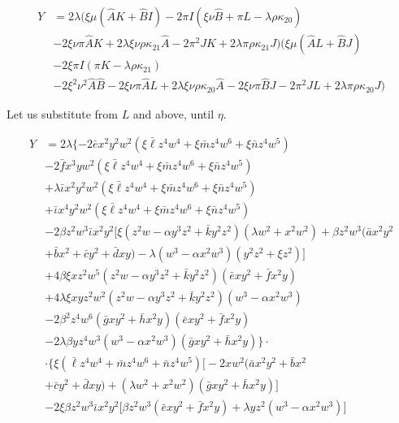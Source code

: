 \begin{align}
Y &= 2\lambda (\xi \mu(\hat AK  + \hat BI )-2\pi I(\xi \nu \hat B + \pi L - \lambda \rho \kappa_{20}) \\
& -2\xi \nu \pi \hat A K +2 \lambda \xi \nu \rho \kappa_{21} \hat A -2  \pi^2 J K +2 \lambda \pi \rho \kappa_{21} J)(\xi \mu(\hat AL + \hat BJ) \\
&-2\xi \pi I(\pi K - \lambda \rho \kappa_{21})\\
&-2\xi^2 \nu^2 \hat A \hat B -2 \xi \nu \pi \hat A L +2 \lambda \xi \nu \rho \kappa_{20} \hat A-2 \xi \nu \pi \hat B J -2 \pi^2 J L +2 \lambda \pi \rho \kappa_{20} J)
\end{align}

Let us substitute from $L$ and above, until $\eta$.

\begin{align}
Y &= 2\lambda \{-2\bar e x^2 y^2 w^2(\xi\bar \ell z^4 w^4 + \xi\bar m z^4 w^6 + \xi\bar n z^4 w^5)\\
&-2 \bar f x^3 y w^2(\xi\bar \ell z^4 w^4 + \xi\bar m z^4 w^6 + \xi\bar n z^4 w^5)\\
&+ \lambda \bar\iota x^2 y^2 w^2(\xi\bar \ell z^4 w^4 + \xi\bar m z^4 w^6 + \xi\bar n z^4 w^5)\\
&+ \bar\iota x^4y^2 w^2(\xi\bar \ell z^4 w^4 + \xi\bar m z^4 w^6 + \xi\bar n z^4 w^5)\\
&-2\beta z^2w^3 \bar \iota x^2 y^2\biggl[\xi ( z^2 w - \alpha y^3 z^2 + \bar k y^2 z^2) (\lambda w^2 + x^2 w^2) + \beta z^2w^3 (\bar a x^2 y^2 \\
&+ \bar b x^2 + \bar c y^2 + \bar d xy) - \lambda (w^3 - \alpha x^2 w^3) (y^2 z^2 + \xi z^2)\biggl] \\
& +4\beta\xi x z^2w^5( z^2 w - \alpha y^3 z^2 + \bar k y^2 z^2)   (\bar e xy^2 + \bar f x^2 y) \\
&+4 \lambda \xi xyz^2 w^2( z^2 w - \alpha y^3 z^2 + \bar k y^2 z^2) (w^3 - \alpha x^2 w^3)  \\
&-2  \beta^2 z^4w^6 (\bar g xy^2 + \bar h x^2 y) (\bar e xy^2 + \bar f x^2 y) \\
&-2 \lambda \beta y z^4w^3 (w^3 - \alpha x^2 w^3) (\bar g xy^2 + \bar h x^2 y)\} \cdot \\
&\cdot \{\xi (\bar \ell z^4 w^4 + \bar m z^4 w^6 + \bar n z^4 w^5)\biggl[-2xw^2(\bar a x^2 y^2 + \bar b x^2 
\\&+ \bar c y^2 + \bar d xy ) + (\lambda w^2 + x^2 w^2)(\bar g xy^2 + \bar h x^2 y)\biggl] \\
&-2\xi \beta z^2w^3 \bar \iota x^2 y^2\biggl[\beta z^2w^3 (\bar e xy^2 + \bar f x^2 y) + \lambda yz^2 (w^3 - \alpha x^2 w^3) \biggl]\\

\end{align}
